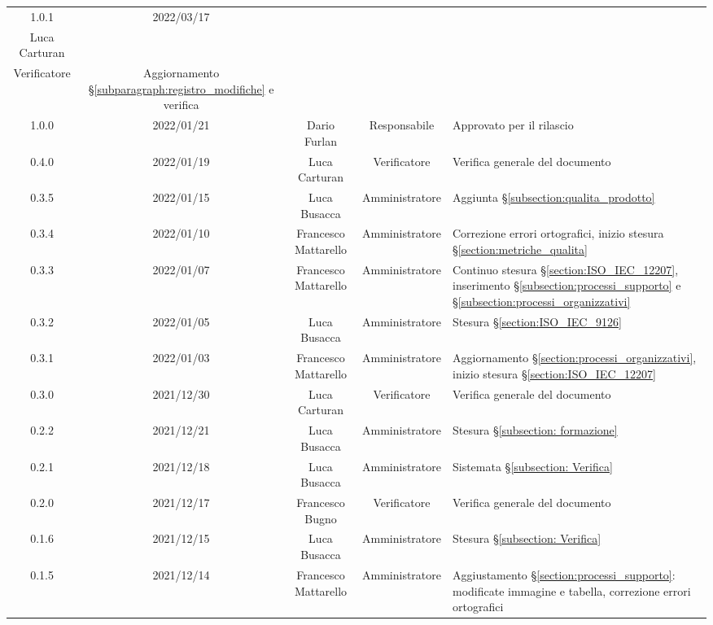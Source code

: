 \begin{center}
\begin{longtable}[c]{c | c | c | c | p{5cm}}
		1.0.1 & 2022/03/17 & \begin{tabular}{c@{}c@{}} Francesco Mattarello \\ Luca Carturan \end{tabular} & \begin{tabular} {c@{}c@{}}Amministratore \\ Verificatore \end{tabular} &  Aggiornamento §\ref{subparagraph:registro_modifiche} e verifica \\
		
		1.0.0 & 2022/01/21 & Dario Furlan & Responsabile & Approvato per il rilascio \\
		0.4.0 & 2022/01/19 & Luca Carturan & Verificatore & Verifica generale del documento \\
		0.3.5 & 2022/01/15 & Luca Busacca & Amministratore & Aggiunta §\ref{subsection:qualita_prodotto} \\
		0.3.4 & 2022/01/10 & Francesco Mattarello & Amministratore & Correzione errori ortografici, inizio stesura §\ref{section:metriche_qualita} \\
		0.3.3 & 2022/01/07 & Francesco Mattarello & Amministratore & Continuo stesura §\ref{section:ISO_IEC_12207}, inserimento §\ref{subsection:processi_supporto} e §\ref{subsection:processi_organizzativi} \\
		0.3.2 & 2022/01/05 & Luca Busacca         & Amministratore & Stesura §\ref{section:ISO_IEC_9126} \\
		0.3.1 & 2022/01/03 & Francesco Mattarello & Amministratore & Aggiornamento §\ref{section:processi_organizzativi}, inizio stesura §\ref{section:ISO_IEC_12207} \\
		0.3.0 & 2021/12/30 & Luca Carturan        & Verificatore   & Verifica generale del documento \\
		0.2.2 & 2021/12/21 & Luca Busacca         & Amministratore & Stesura §\ref{subsection: formazione} \\
		0.2.1 & 2021/12/18 & Luca Busacca         & Amministratore & Sistemata §\ref{subsection: Verifica} \\
		0.2.0 & 2021/12/17 & Francesco Bugno      & Verificatore   & Verifica generale del documento \\
		0.1.6 & 2021/12/15 & Luca Busacca         & Amministratore & Stesura §\ref{subsection: Verifica} \\
		0.1.5 & 2021/12/14 & Francesco Mattarello & Amministratore & Aggiustamento §\ref{section:processi_supporto}: modificate immagine e tabella, correzione errori ortografici \\

\end{longtable}
\end{center}
